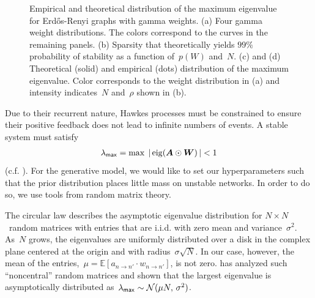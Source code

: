 \begin{figure}[!ht]
\begin{center}
\begin{subfigure}[b]{.22\textwidth}
\end{subfigure}
\end{center}
\vspace{-1em}
\caption[Distribution of the maximum eigenvalue for Erd\H{o}s-Renyi
  graphs with gamma weights]{Empirical and theoretical distribution of
  the maximum eigenvalue for Erd\H{o}s-Renyi graphs with gamma
  weights. (a) Four gamma weight distributions. The colors correspond
  to the curves in the remaining panels. (b) Sparsity that
  theoretically yields ${99\%}$ probability of stability as a function
  of~${p(W)}$ and~$N$. (c) and (d) Theoretical (solid) and empirical
  (dots) distribution of the maximum eigenvalue. Color corresponds to
  the weight distribution in (a) and intensity indicates~$N$
  and~$\rho$ shown in (b).}
\label{fig:stability}
\end{figure}

Due to their recurrent nature, Hawkes processes must be constrained to
ensure their positive feedback does not lead to infinite numbers of
events. A stable system must satisfy
\begin{align*}
  \lambda_{\mathsf{max}}=\max\; |\,\mathrm{eig}(\boldsymbol{A}\odot\boldsymbol{W})\,| < 1
\end{align*}
(c.f. \citet{Daley-1988}).
For the generative model, we would like
to set our hyperparameters such that the prior distribution places
little mass on unstable networks. In order to do so, we use tools from
random matrix theory.

The circular law describes the asymptotic eigenvalue distribution for
$N \times N$~random matrices with entries that are i.i.d. with zero
mean and variance~$\sigma^2$. As~$N$ grows, the eigenvalues are
uniformly distributed over a disk in the complex plane centered at the
origin and with radius~$\sigma\sqrt{N}$. In our case, however, the
mean of the entries,~${\mu=\mathbb{E}[a_{n \to n'} \cdot w_{n \to
      n'}]}$, is not zero. \citet{Silverstein-1994} has analyzed such
``noncentral'' random matrices and shown that the largest eigenvalue
is asymptotically distributed
as~${\lambda_{\sf{max}} \sim \mathcal{N}(\mu N,\, \sigma^2)}$.

